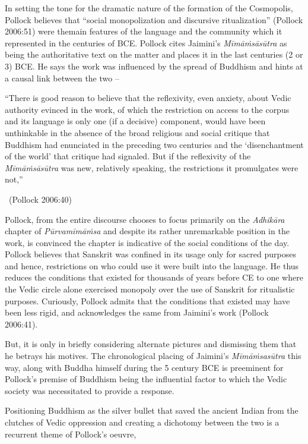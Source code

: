 In setting the tone for the dramatic nature of the formation of the Cosmopolis, Pollock believes that “social monopolization and discursive ritualization” (Pollock 2006:51) were themain features of the language and the community which it represented in the centuries of BCE. Pollock cites Jaimini’s \textit{Mīmāṁsāsūtra} as being the authoritative text on the matter and places it in the last centuries (2 or 3) BCE. He says the work was influenced by the spread of Buddhism and hints at a causal link between the two –

\begin{myquote}
“There is good reason to believe that the reflexivity, even anxiety, about Vedic authority evinced in the work, of which the restriction on access to the corpus and its language is only one (if a decisive) component, would have been unthinkable in the absence of the broad religious and social critique that Buddhism had enunciated in the preceding two centuries and the ‘disenchantment of the world’ that critique had signaled. But if the reflexivity of the \textit{Mīmāṁsāsūtra} was new, relatively speaking, the restrictions it promulgates were not,” 

~\hfill (Pollock 2006:40)
\end{myquote}

Pollock, from the entire discourse chooses to focus primarily on the \textit{Adhikāra} chapter of \textit{Pūrvamīmāṁsa} and despite its rather unremarkable position in the work, is convinced the chapter is indicative of the social conditions of the day. Pollock believes that Sanskrit was confined in its usage only for sacred purposes and hence, restrictions on who could use it were built into the language. He thus reduces the conditions that existed for thousands of years before CE to one where the Vedic circle alone exercised monopoly over the use of Sanskrit for ritualistic purposes. Curiously, Pollock admits that the conditions that existed may have been less rigid, and acknowledges the same from Jaimini’s work (Pollock 2006:41).

But, it is only in briefly considering alternate pictures and dismissing them that he betrays his motives. The chronological placing of Jaimini’s \textit{Mīmāṁsasūtra} this way, along with Buddha himself during the 5 century BCE is preeminent for Pollock’s premise of Buddhism being the influential factor to which the Vedic society was necessitated to provide a response.

Positioning Buddhism as the silver bullet that saved the ancient Indian from the clutches of Vedic oppression and creating a dichotomy between the two is a recurrent theme of Pollock’s oeuvre,

